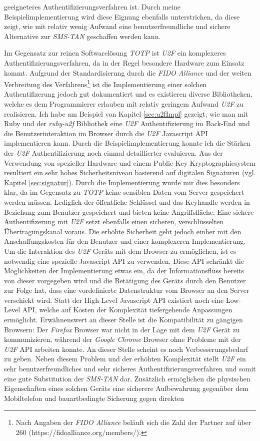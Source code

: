 \documentclass[11pt,a4paper,ngerman]{scrreprt}
\begin{document}
geeigneteres Authentifizierungsverfahren ist. Durch meine Beispielimplementierung wird diese Eignung ebenfalls unterstrichen, da diese zeigt, wie mit relativ wenig Aufwand eine benutzerfreundliche und sichere Alternative zur \textit{SMS-TAN} geschaffen werden kann.

Im Gegensatz zur reinen Softwarelösung \textit{TOTP} ist \textit{U2F} ein komplexeres Authentifizierungsverfahren, da in der Regel besondere Hardware zum Einsatz kommt. Aufgrund der Standardisierung durch die \textit{FIDO Alliance} und der weiten Verbreitung des Verfahrens\footnote{Nach Angaben der \textit{FIDO Alliance} beläuft sich die Zahl der Partner auf über 260 (https://fidoalliance.org/members/).} ist die Implementierung einer solchen Authentifizerung jedoch gut dokumentiert und es existieren diverse Bibliotheken, welche es dem Programmierer erlauben mit relativ geringem Aufwand \textit{U2F} zu realisieren. Ich habe am Beispiel von Kapitel \ref{sec:u2fImpl} gezeigt, wie man mit Ruby und der \textit{ruby-u2f} Bibliothek eine \textit{U2F} Authentifizierung im Back-End und die Benutzerinteraktion im Browser durch die \textit{U2F} Javascript API implementieren kann. Durch die Beispielimplementierung konnte ich die Stärken der \textit{U2F} Authentifizierung noch einmal detaillierter evaluieren. Aus der Verwendung von spezieller Hardware und einem Public-Key Kryptographiesystem resultiert ein sehr hohes Sicherheitsniveau basierend auf digitalen Signaturen (vgl. Kapitel \ref{sec:signatur}). Durch die Implementierung wurde mir dies besonders klar, da im Gegensatz zu \textit{TOTP} keine sensiblen Daten vom Server gespeichert werden müssen. Lediglich der öffentliche Schlüssel und das Keyhandle werden in Beziehung zum Benutzer gespeichert und bieten keine Angriffsfläche. Eine sichere Authentifizerung mit \textit{U2F} setzt ebenfalls einen sicheren, verschlüsselten Übertragungskanal voraus. Die erhöhte Sicherheit geht jedoch einher mit den Anschaffungskosten für den Benutzer und einer komplexeren Implementierung. Um die Interaktion des \textit{U2F} Geräts mit dem Browser zu ermöglichen, ist es notwendig eine spezielle Javascript API zu verwenden. Diese API schränkt die Möglichkeiten der Implementierung etwas ein, da der Informationsfluss bereits von dieser vorgegeben wird und die Betätigung des Geräts durch den Benutzer zur Folge hat, dass eine vordefinierte Datenstruktur vom Browser an den Server verschickt wird. Statt der High-Level Javascript API existiert noch eine Low-Level API, welche auf Kosten der Komplexität tiefergehende Anpassungen ermöglicht. Erwähnenswert an dieser Stelle ist die Kompatibilität zu gängigen Browsern: Der \textit{Firefox} Browser war nicht in der Lage mit dem \textit{U2F} Gerät zu kommunizieren, während der \textit{Google Chrome} Browser ohne Probleme mit der \textit{U2F} API arbeiten konnte. An dieser Stelle scheint es noch Verbesserungsbedarf zu geben. Neben diesem Problem und der erhöhten Komplexität stellt \textit{U2F} ein sehr benutzerfreundliches und sehr sicheres Authentifizierungsverfahren und somit eine gute Substitution der \textit{SMS-TAN} dar. Zusätzlich ermöglichen die physischen Eigenschaften eines solchen Geräts eine sicherere Aufbewahrung gegenüber dem Mobiltelefon und bauartbedingte Sicherung gegen direkten 
\end{document}
